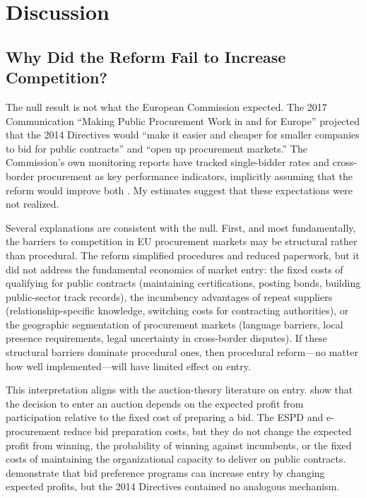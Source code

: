 \documentclass[12pt]{article}
\begin{document}
\section{Discussion}
\label{sec:discussion}

\subsection{Why Did the Reform Fail to Increase Competition?}

The null result is not what the European Commission expected. The 2017 Communication ``Making Public Procurement Work in and for Europe'' \citep{europeancommission2017} projected that the 2014 Directives would ``make it easier and cheaper for smaller companies to bid for public contracts'' and ``open up procurement markets.'' The Commission's own monitoring reports have tracked single-bidder rates and cross-border procurement as key performance indicators, implicitly assuming that the reform would improve both \citep{europeancommission2019, europeancommission2021}. My estimates suggest that these expectations were not realized.

Several explanations are consistent with the null. First, and most fundamentally, the barriers to competition in EU procurement markets may be structural rather than procedural. The reform simplified procedures and reduced paperwork, but it did not address the fundamental economics of market entry: the fixed costs of qualifying for public contracts (maintaining certifications, posting bonds, building public-sector track records), the incumbency advantages of repeat suppliers (relationship-specific knowledge, switching costs for contracting authorities), or the geographic segmentation of procurement markets (language barriers, local presence requirements, legal uncertainty in cross-border disputes). If these structural barriers dominate procedural ones, then procedural reform---no matter how well implemented---will have limited effect on entry.

This interpretation aligns with the auction-theory literature on entry. \citet{mcafee1987} show that the decision to enter an auction depends on the expected profit from participation relative to the fixed cost of preparing a bid. The ESPD and e-procurement reduce bid preparation costs, but they do not change the expected profit from winning, the probability of winning against incumbents, or the fixed costs of maintaining the organizational capacity to deliver on public contracts. \citet{krasnokutskaya2011} demonstrate that bid preference programs can increase entry by changing expected profits, but the 2014 Directives contained no analogous mechanism.
\end{document}
